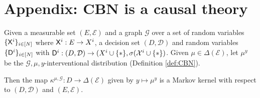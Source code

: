 \section{Appendix: CBN is a causal theory}\label{app:cbn_ct}

\begin{theorem}\label{th:cbn_MK}
Given a measurable set $(E,\mathcal{E})$ and a graph $\mathcal{G}$ over a set of random variables $\{\mathsf{X}^i\}_{i\in[N]}$ where $\mathsf{X}^i:E\to X^i$, a decision set $(D,\mathcal{D})$ and random variables $\{\mathsf{D}^i\}_{i\in[N]}$ with $\mathsf{D}^i:(D,\mathcal{D})\to (X^i\cup\{*\},\sigma(\mathcal{X}^i\cup\{*\})$. Given $\mu\in \Delta(\mathcal{E})$, let $\mu^y$ be the $\mathcal{G},\mu,y$-interventional distribution (Definition \ref{def:CBN}). 

Then the map $\kappa^{\mu,\mathcal{G}}:D\to \Delta(\mathcal{E})$ given by $y\mapsto \mu^y$ is a Markov kernel with respect to $(D,\mathcal{D})$ and $(E,\mathcal{E})$.
\end{theorem}

